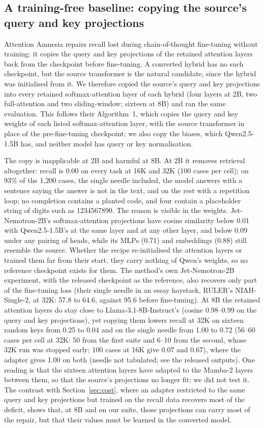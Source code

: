 \documentclass[11pt]{article}
\begin{document}
\subsection{A training-free baseline: copying the source's query and key projections}
\label{sec:restore}
Attention Amnesia \citep{attentionamnesia2026} repairs recall lost during chain-of-thought fine-tuning without training: it copies the query and key projections of the retained attention layers back from the checkpoint before fine-tuning. A converted hybrid has no such checkpoint, but the source transformer is the natural candidate, since the hybrid was initialised from it. We therefore copied the source's query and key projections into every retained softmax-attention layer of each hybrid (four layers at 2B, two full-attention and two sliding-window; sixteen at 8B) and ran the same evaluation. This follows their Algorithm~1, which copies the query and key weights of each listed softmax-attention layer, with the source transformer in place of the pre-fine-tuning checkpoint; we also copy the biases, which Qwen2.5-1.5B has, and neither model has query or key normalisation.

The copy is inapplicable at 2B and harmful at 8B. At 2B it removes retrieval altogether: recall is 0.00 on every task at 16K and 32K (100 cases per cell); on 93\% of the 1,200 cases, the single needle included, the model answers with a sentence saying the answer is not in the text, and on the rest with a repetition loop; no completion contains a planted code, and four contain a placeholder string of digits such as 1234567890. The reason is visible in the weights. Jet-Nemotron-2B's softmax-attention projections have cosine similarity below 0.01 with Qwen2.5-1.5B's at the same layer and at any other layer, and below 0.09 under any pairing of heads, while its MLPs (0.71) and embeddings (0.88) still resemble the source. Whether the recipe re-initialised the attention layers or trained them far from their start, they carry nothing of Qwen's weights, so no reference checkpoint exists for them. The method's own Jet-Nemotron-2B experiment, with the released checkpoint as the reference, also recovers only part of the fine-tuning loss (their single needle in an essay haystack, RULER's NIAH-Single-2, at 32K: 57.8 to 64.6, against 95.6 before fine-tuning). At 8B the retained attention layers do stay close to Llama-3.1-8B-Instruct's (cosine 0.98--0.99 on the query and key projections), yet copying them lowers recall at 32K on sixteen random keys from 0.25 to 0.04 and on the single needle from 1.00 to 0.72 (56--60 cases per cell at 32K: 50 from the first suite and 6--10 from the second, whose 32K run was stopped early; 100 cases at 16K give 0.07 and 0.67), where the adapter gives 1.00 on both (needle not tabulated; see the released outputs). One reading is that the sixteen attention layers have adapted to the Mamba-2 layers between them, so that the source's projections no longer fit; we did not test it. The contrast with Section~\ref{sec:cost}, where an adapter restricted to the same query and key projections but trained on the recall data recovers most of the deficit, shows that, at 8B and on our suite, those projections can carry most of the repair, but that their values must be learned in the converted model.
\end{document}
